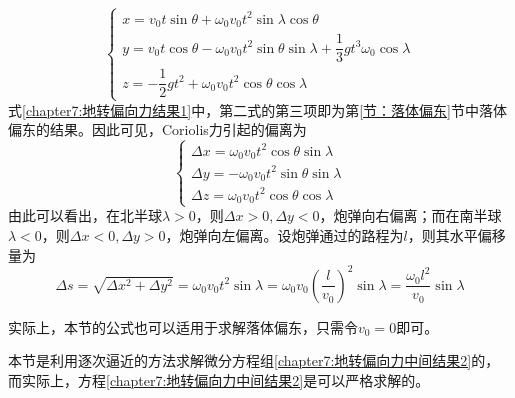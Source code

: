 \begin{equation}
\begin{cases}
	x = v_0t\sin\theta + \omega_0v_0t^2\sin\lambda\cos\theta \\
	y = v_0t\cos\theta - \omega_0v_0t^2\sin\theta\sin\lambda + \dfrac13gt^3 \omega_0\cos\lambda \\
	z = -\dfrac12 gt^2 + \omega_0v_0t^2\cos\theta\cos\lambda
\end{cases}
\label{chapter7:地转偏向力结果1}
\end{equation}
式\eqref{chapter7:地转偏向力结果1}中，第二式的第三项即为第\ref{节：落体偏东}节中落体偏东的结果。因此可见，Coriolis力引起的偏离为
\begin{equation}
\begin{cases}
	\Delta x = \omega_0v_0t^2 \cos\theta\sin\lambda \\
	\Delta y = -\omega_0v_0t^2 \sin\theta\sin\lambda \\
	\Delta z = \omega_0v_0t^2 \cos\theta\cos\lambda
\end{cases}
\end{equation}
由此可以看出，在北半球$\lambda>0$，则$\Delta x>0,\Delta y<0$，炮弹向右偏离；而在南半球$\lambda<0$，则$\Delta x<0,\Delta y>0$，炮弹向左偏离。设炮弹通过的路程为$l$，则其水平偏移量为
\begin{equation}
	\Delta s = \sqrt{\Delta x^2 + \Delta y^2} = \omega_0v_0t^2\sin\lambda = \omega_0v_0\left(\frac{l}{v_0}\right)^2\sin\lambda = \frac{\omega_0l^2}{v_0}\sin\lambda
\end{equation}

实际上，本节的公式也可以适用于求解落体偏东，只需令$v_0=0$即可。

本节是利用逐次逼近的方法求解微分方程组\eqref{chapter7:地转偏向力中间结果2}的，而实际上，方程\eqref{chapter7:地转偏向力中间结果2}是可以严格求解的。

